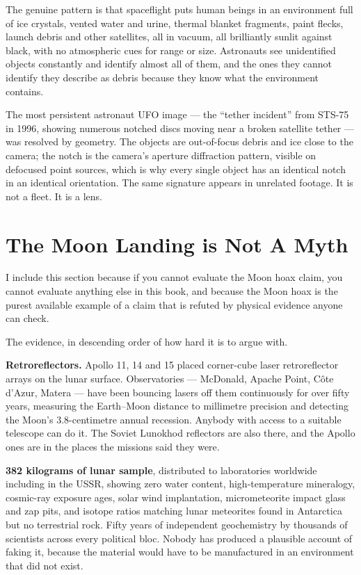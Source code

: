 The genuine pattern is that spaceflight puts human beings in an environment full of ice crystals,
vented water and urine, thermal blanket fragments, paint flecks, launch debris and other
satellites, all in vacuum, all brilliantly sunlit against black, with no atmospheric cues for range
or size. Astronauts see unidentified objects constantly and identify almost all of them, and the
ones they cannot identify they describe as debris because they know what the environment contains.

\begin{funfact}
The most persistent astronaut UFO image --- the ``tether incident'' from STS-75 in 1996, showing
numerous notched discs moving near a broken satellite tether --- was resolved by geometry. The
objects are out-of-focus debris and ice close to the camera; the notch is the camera's aperture
diffraction pattern, visible on defocused point sources, which is why every single object has an
identical notch in an identical orientation. The same signature appears in unrelated footage. It is
not a fleet. It is a lens.
\end{funfact}

\section{The Moon Landing is Not A Myth}\label{sec:moonlandingnotmyth}

I include this section because if you cannot evaluate the Moon hoax claim, you cannot evaluate
anything else in this book, and because the Moon hoax is the purest available example of a claim
that is refuted by physical evidence anyone can check.

The evidence, in descending order of how hard it is to argue with.

\textbf{Retroreflectors.} Apollo 11, 14 and 15 placed corner-cube laser retroreflector arrays on
the lunar surface. Observatories --- McDonald, Ap\-ache Point, C\^ote d'Azur, Matera --- have been
bouncing lasers off them continuously for over fifty years, measuring the Earth--Moon distance to
millimetre precision and detecting the Moon's 3.8-centimetre annual recession. Anybody with access
to a suitable telescope can do it. The Soviet Lunokhod reflectors are also there, and the Apollo
ones are in the places the missions said they were.

\textbf{382 kilograms of lunar sample}, distributed to laboratories worldwide including in the
USSR, showing zero water content, high-temperature mineralogy, cosmic-ray exposure ages, solar wind
implantation, micrometeorite impact glass and zap pits, and isotope ratios matching lunar
meteorites found in Antarctica but no terrestrial rock. Fifty years of independent geochemistry by
thousands of scientists across every political bloc. Nobody has produced a plausible account of
faking it, because the material would have to be manufactured in an environment that did not exist.

